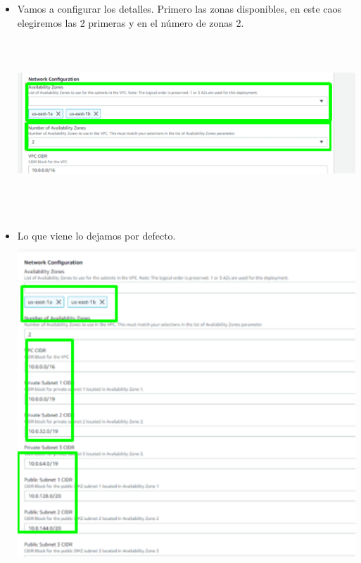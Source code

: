 \documentclass[12pt,a4paper,oneside]{book}
\begin{document}
\newpage
\begin{itemize}
	\item {Vamos a configurar los detalles. Primero las zonas disponibles, en este caos elegiremos las 2 primeras y en el número de zonas 2.}\\
	
	\includegraphics[width=16cm, height=7cm]{img/9.png}\\
	
	\item {Lo que viene lo dejamos por defecto.}\\
	
	\includegraphics[width=16cm, height=12cm]{img/10.png}\\
	
\end{itemize}
\end{document}
